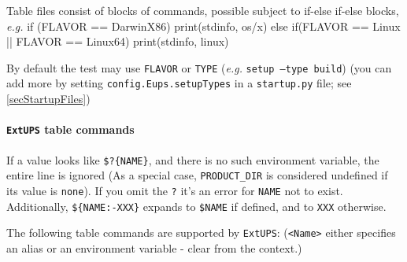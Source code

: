 \documentclass{article}
\newcommand{\code}[1]{\texttt{#1}}
\newcommand{\file}[1]{\texttt{#1}}
\newcommand{\eups}{\code{ExtUPS}\xspace}
\let\overbatim=\verbatim
\let\oendverbatim=\endverbatim
\renewenvironment{verbatim}
{\center\minipage{16cm}\overbatim}
{\oendverbatim\endminipage\endcenter}
\begin{document}
Table files consist of blocks of commands, possible subject to if-else if-else blocks, \textit{e.g.}
\begin{verbatim}
if (FLAVOR == DarwinX86) {
   print(stdinfo, os/x)
} else if(FLAVOR == Linux || FLAVOR == Linux64) {
   print(stdinfo, linux)
}
\end{verbatim}

By default the test may use \code{FLAVOR} or \code{TYPE} (\textit{e.g.} \code{setup --type build})
(you can add more by setting \code{config.Eups.setupTypes} in a \file{startup.py} file; see
\ref{secStartupFiles})

\paragraph{\eups table commands}

If a value looks like \code{\$?\{NAME\}}, and there is no such environment variable, the entire line is
ignored (As a special case, \code{PRODUCT\_DIR} is considered undefined if its value is \code{none}).
If you omit the \code{?} it's an error for \code{NAME} not to exist.
Additionally, \code{\$\{NAME:-XXX\}} expands to \code{\$NAME} if defined, and to \code{XXX} otherwise.

The following table commands are supported by \eups: (\code{<Name>} either specifies an
alias or an environment variable - clear from the context.)
\end{document}
